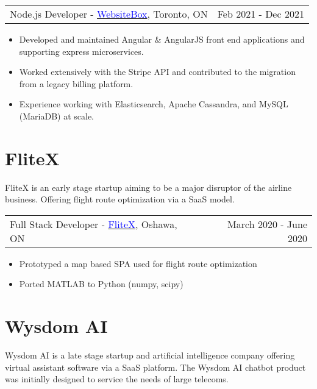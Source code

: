 \documentclass[margin]{res}
\begin{document}
\begin{resume}
	\begin{tabular}{p{3in} r} %
		Node.js Developer - \href{https://websitebox.com}{\textcolor{blue}{WebsiteBox}}, Toronto, ON & Feb 2021 - Dec 2021
	\end{tabular}

	\begin{itemize} %
		\item Developed and maintained Angular \& AngularJS front end applications and supporting
		      express microservices.
		\item Worked extensively with the Stripe API and contributed to the migration from a legacy
		      billing platform.
		\item Experience working with Elasticsearch, Apache Cassandra, and MySQL (MariaDB) at scale.
	\end{itemize}

	\normalsize{\section{FliteX}}

	FliteX is an early stage startup aiming to be a major disruptor of the airline business.
	Offering flight route optimization via a SaaS model.

	\begin{tabular}{p{3in} r} %
		Full Stack Developer - \href{https://flitex.net/}{\textcolor{blue}{FliteX}}, Oshawa, ON & March 2020 - June 2020
	\end{tabular}
	\begin{itemize} %
		\item Prototyped a map based SPA used for flight route optimization
		\item Ported MATLAB to Python (numpy, scipy)
	\end{itemize}

	\normalsize{\section{Wysdom AI}}

	Wysdom AI is a late stage startup and artificial intelligence company offering virtual assistant software
	via a SaaS platform. The Wysdom AI chatbot product was initially designed to service the needs of
	large telecoms.


\end{resume}
\end{document}
